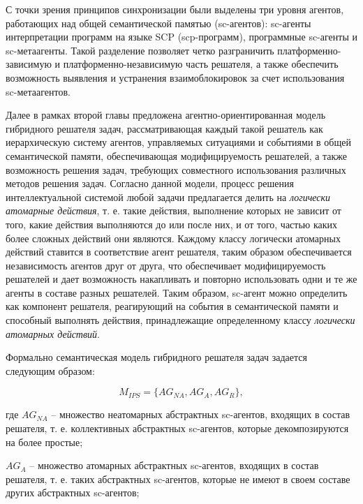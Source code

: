 \documentclass{thesisby}
\begin{document}
\medskip
\parindent=1cm

С точки зрения принципов синхронизации были выделены три уровня агентов, работающих над общей семантической памятью (sc-агентов): \mbox{sc-агенты} интерпретации программ на языке SCP (scp-программ), программные \mbox{sc-агенты} и \mbox{sc-метаагенты}. Такой разделение позволяет четко разграничить платформенно-зависимую и платформенно-независимую часть решателя, а также обеспечить возможность выявления и устранения взаимоблокировок за счет использования sc-метаагентов.

Далее в рамках второй главы предложена агентно-ориентированная модель гибридного решателя задач, рассматривающая каждый такой решатель как иерархическую систему агентов, управляемых ситуациями и событиями в общей семантической памяти, обеспечивающая модифицируемость решателей, а также возможность решения задач, требующих совместного использования различных методов решения задач. Согласно данной модели, процесс решения интеллектуальной системой любой задачи предлагается делить на \textit{логически атомарные действия}, т. е. такие действия, выполнение которых не зависит от того, какие действия выполняются до или после них, и от того, частью каких более сложных действий они являются. Каждому классу логически атомарных действий ставится в соответствие агент решателя, таким образом обеспечивается независимость агентов друг от друга, что обеспечивает модифицируемость решателей и дает возможность накапливать и повторно использовать одни и те же агенты в составе разных решателей. Таким образом, sc-агент можно определить как компонент решателя, реагирующий на события в семантической памяти и способный выполнять действия, принадлежащие определенному классу \textit{логически атомарных действий}.

Формально семантическая модель гибридного решателя задач задается следующим образом:

\vspace{-4mm}

\begin{equation}
    \label{<eq2_6>} 
    M_{IPS} = \{AG_{NA}, AG_A, AG_R\},	
\end{equation}

\noindent \hangindent=29mm 
где $AG_{NA}$ – множество неатомарных абстрактных sc-агентов, входящих в состав решателя, т. е. коллективных абстрактных sc-агентов, которые декомпозируются на более простые;

\parindent=9mm \hangindent=25mm 
$AG_A$ – множество атомарных абстрактных sc-агентов, входящих в состав решателя, т. е. таких абстрактных sc-агентов, которые не имеют в своем составе других абстрактных sc-агентов;
\end{document}
